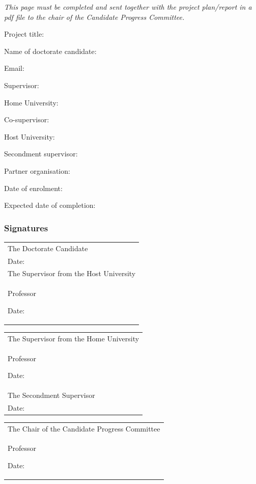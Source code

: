 \documentclass[12pt]{article}
\newcommand{\dottedline}{%
   {\rule{0pt}{5mm}\dotfill\newline}}
\begin{document}
\emph{This page must be completed and sent together with the project
plan/report in a pdf file to the chair of the Candidate Progress Committee.}

\vspace*{3mm}

\noindent
Project title: \dottedline
Name of doctorate candidate: \dottedline
Email: \dottedline
Supervisor: \dottedline
Home University: \dottedline
Co-supervisor: \dottedline
Host University: \dottedline
Secondment supervisor: \dottedline
Partner organisation: \dottedline
Date of enrolment: \dottedline
Expected date of completion: \dottedline

\vspace*{3mm}
\subsubsection*{Signatures}
\vspace*{3mm}

\begin{tabular}{p{}}
The Doctorate Candidate\\
\dottedline
\vspace{2cm}%
Date: \\

The Supervisor from the Host University\\
Professor \dottedline
\vspace{2cm}%
Date: \\

\end{tabular}
%
\begin{tabular}{p{}}
The Supervisor from the Home University\\
Professor \dottedline
\vspace{2cm}%
Date: \\

The Secondment Supervisor \\
\dottedline
\vspace{2cm}%
Date: \\

\end{tabular}


\begin{center}
\begin{tabular}{p{}}
The Chair of the Candidate Progress Committee\\
Professor \dottedline
\vspace{2cm}%
Date: \\

\end{tabular}
\end{center}
\end{document}
